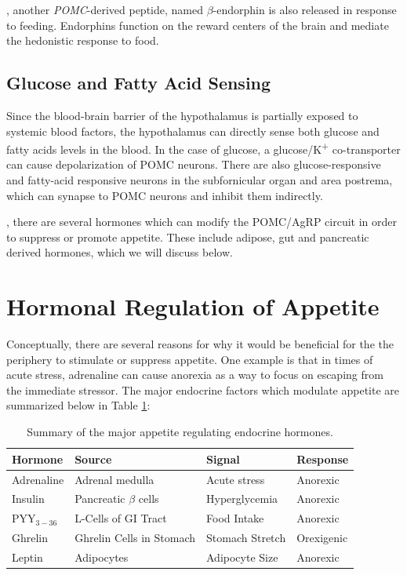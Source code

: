 \documentclass{tufte-handout}
\begin{document}
, another \textit{POMC}-derived peptide, named $\beta$-endorphin is also released in response to feeding.  Endorphins function on the reward centers of the brain and mediate the hedonistic response to food.

\subsection{Glucose and Fatty Acid Sensing}

Since the blood-brain barrier of the hypothalamus is partially exposed to systemic blood factors, the hypothalamus can directly sense both glucose and fatty acids levels in the blood.  In the case of glucose, a glucose/K\textsuperscript{+} co-transporter can cause depolarization of POMC neurons\cite{Parton2007}.  There are also glucose-responsive and fatty-acid responsive neurons in the subfornicular organ and area postrema, which can synapse to POMC neurons and inhibit them indirectly.

, there are several hormones which can modify the POMC/AgRP circuit in order to suppress or promote appetite.  These include adipose, gut and pancreatic derived hormones, which we will discuss below.

\section{Hormonal Regulation of Appetite}

Conceptually, there are several reasons for why it would be beneficial for the the periphery to stimulate or suppress appetite.  One example is that in times of acute stress, adrenaline can cause anorexia\cite{RUSSEK1962} as a way to focus on escaping from the immediate stressor.  The major endocrine factors which modulate appetite are summarized below in Table \ref{tab:appetite-hormones}:

\begin{table}
  \centering
  \begin{tabular}{llll}
    \toprule
    Hormone & Source & Signal & Response \\
    \midrule
    Adrenaline & Adrenal medulla & Acute stress & Anorexic \\
    Insulin & Pancreatic $\beta$ cells & Hyperglycemia & Anorexic \\
    PYY$_{3-36}$ & L-Cells of GI Tract & Food Intake & Anorexic \\
    Ghrelin & Ghrelin Cells in Stomach & Stomach Stretch & Orexigenic \\
    Leptin & Adipocytes & Adipocyte Size & Anorexic \\
    \bottomrule
  \end{tabular}
  \caption{Summary of the major appetite regulating endocrine hormones.}
  \label{tab:appetite-hormones}
\end{table}
\end{document}
